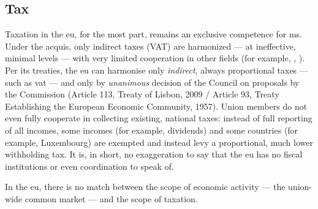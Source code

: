 



\subsection{Tax}
Taxation in the \gls{eu}, for the most part, remains an exclusive competence for \gls{ms}.
Under the acquis, only indirect taxes (VAT) are harmonized --- at ineffective, minimal levels --- with very limited cooperation in other fields (for example, \citealt{EuropeanCommission2009}, \citealt{TaxCoordinationandTaxCompetitionintheEuropeanUnion-EvaluatingtheCodeofConductonBusinessTaxation2001}).
Per its treaties, the \gls{eu} can harmonise only \emph{indirect}, always proportional taxes --- such as \gls{vat} --- and only by \emph{unanimous} decision of the Council on proposals by the Commission (Article 113, Treaty of Lisbon, 2009 / Article 93, Treaty Establishing the European Economic Community, 1957).
Union members do not even fully cooperate in collecting existing, national taxes:
instead of full reporting of all incomes, some incomes (for example, dividends) and some countries (for example, Luxembourg) are exempted and instead levy a proportional, much lower withholding tax.
It is, in short, no exaggeration to say that the \gls{eu} has no fiscal institutions or even coordination to speak of.

In the \gls{eu}, there is no match between the scope of economic activity --- the union-wide common market --- and the scope of taxation.

